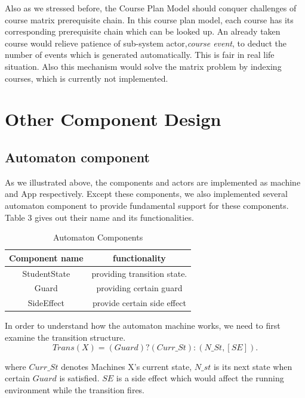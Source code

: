 \documentclass{sig-alternate}
\begin{document}
Also as we stressed before, the Course Plan Model should conquer challenges of course matrix prerequisite chain.  In this course plan model,  each course has its corresponding prerequisite chain which can be looked up. An already taken course would relieve patience of sub-system actor,{\em course event}, to deduct the number of events which is generated automatically.  This is fair in real life situation.  Also this mechanism would solve the matrix problem by indexing courses, which is currently not implemented. \\ 

\section{Other Component Design}
\subsection {Automaton component}
As we illustrated above, the components and actors are implemented as machine and App respectively. Except these components, we also implemented several automaton component to provide fundamental support for these components.  Table 3 gives out their name and its functionalities. 

\begin{table}[h]
\centering
\caption{Automaton Components  }
\begin{tabular}{|c|c|}\hline
Component name & functionality  \\
\hline
StudentState & providing transition state.\\
\hline
Guard & providing certain guard\\
\hline
SideEffect & provide certain side effect\\
\hline
\end{tabular}
\end{table}

In order to understand how the automaton machine works, we need to first examine the transition structure. \\
\begin{equation}
Trans(X)= (Guard)?(Curr\_St ):(N\_St, [SE]). 
\end{equation}

where $Curr\_St$ denotes Machines X's current state, $N\_st$ is its next state when certain $Guard$ is satisfied.  $SE$ is a side effect which would affect the running environment while the transition fires.  \\
\end{document}
